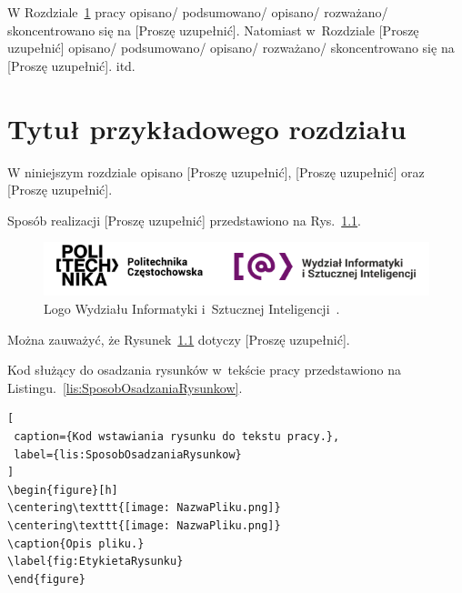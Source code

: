 \documentclass{PracaDyplomowa}
\begin{document}
W Rozdziale~\ref{cha:RozdzialWprowadzajacy} pracy opisano/ podsumowano/ opisano/ rozważano/ skoncentrowano się na [Proszę uzupełnić]. Natomiast w~Rozdziale [Proszę uzupełnić] opisano/ podsumowano/ opisano/ rozważano/ skoncentrowano się na [Proszę uzupełnić]. itd.

\cleardoublepage

\chapter{Tytuł przykładowego rozdziału}
\label{cha:RozdzialWprowadzajacy}


W niniejszym rozdziale opisano [Proszę uzupełnić], [Proszę uzupełnić] oraz [Proszę uzupełnić].

Sposób realizacji [Proszę uzupełnić] przedstawiono na Rys.~\ref{fig:LogoWIiSI}.

\begin{figure}[h]
\centering\includegraphics[width=15cm]{fig_LogoWIiSI.png}
\caption{Logo Wydziału Informatyki i~Sztucznej Inteligencji~\cite{bib:LogoWIMiI}.}
\label{fig:LogoWIiSI}
\end{figure}

\noindent Można zauważyć, że Rysunek~\ref{fig:LogoWIiSI} dotyczy [Proszę uzupełnić].

Kod służący do osadzania rysunków w~tekście pracy przedstawiono na Listingu.~\ref{lis:SposobOsadzaniaRysunkow}.

\begin{lstlisting}[
 caption={Kod wstawiania rysunku do tekstu pracy.},
 label={lis:SposobOsadzaniaRysunkow}
]
\begin{figure}[h]
\centering\texttt{[image: NazwaPliku.png]}
\centering\texttt{[image: NazwaPliku.png]}
\caption{Opis pliku.}
\label{fig:EtykietaRysunku}
\end{figure}
\end{lstlisting}
\end{document}
